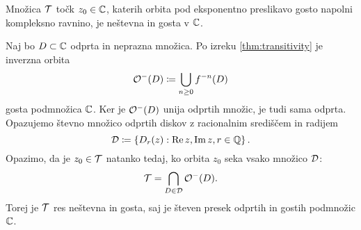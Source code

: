 \begin{posledica}
    Množica \(\mathcal T\) točk \(z_0 \in \mathbb C\), katerih orbita pod eksponentno preslikavo gosto napolni kompleksno ravnino, je neštevna in gosta v \(\mathbb C\).
\end{posledica}

\begin{dokaz}
    Naj bo \(D \subset \mathbb C\) odprta in neprazna množica. Po izreku \ref{thm:transitivity} je inverzna orbita
    \[\mathcal O^- (D) \coloneq \bigcup_{n \geq 0} f^{- n} (D)\]
    gosta podmnožica \(\mathbb C\). Ker je \(\mathcal O^- (D)\) unija odprtih množic, je tudi sama odprta. Opazujemo števno množico odprtih diskov z racionalnim središčem in radijem
    \[\mathcal D \coloneq \left\{ D_r (z) : \operatorname{Re} z, \operatorname{Im} z, r \in \mathbb Q \right\}.\]
    Opazimo, da je \(z_0 \in \mathcal T\) natanko tedaj, ko orbita \(z_0\) seka vsako množico \(\mathcal D\):
    \[\mathcal T = \bigcap_{D \in \mathcal D} \mathcal O^- (D).\]
    Torej je \(\mathcal T\) res neštevna in gosta, saj je števen presek odprtih in gostih podmnožic \(\mathbb C\).
\end{dokaz}